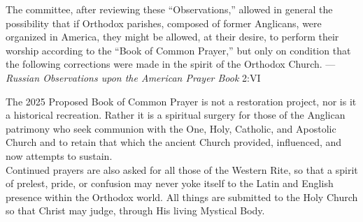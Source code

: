 \begin{quoting}\noindent
	The committee, after reviewing these ``Observations,'' allowed in general the possibility that if Orthodox parishes, composed of former Anglicans, were organized in America, they might be allowed, at their desire, to perform their worship according to the ``Book of Common Prayer,'' but only on condition that the following corrections were made in the spirit of the Orthodox Church. ---\emph{Russian Observations upon the American Prayer Book} 2:VI
\end{quoting}

The 2025 Proposed Book of Common Prayer is not a restoration project, nor is it a historical recreation. Rather it is a spiritual surgery for those of the Anglican patrimony who seek communion with the One, Holy, Catholic, and Apostolic Church and to retain that which the ancient Church provided, influenced, and now attempts to sustain.\\

Continued prayers are also asked for all those of the Western Rite, so that a spirit of prelest, pride, or confusion may never yoke itself to the Latin and English presence within the Orthodox world. All things are submitted to the Holy Church so that Christ may judge, through His living Mystical Body.\\


\vspace{2\baselineskip}



